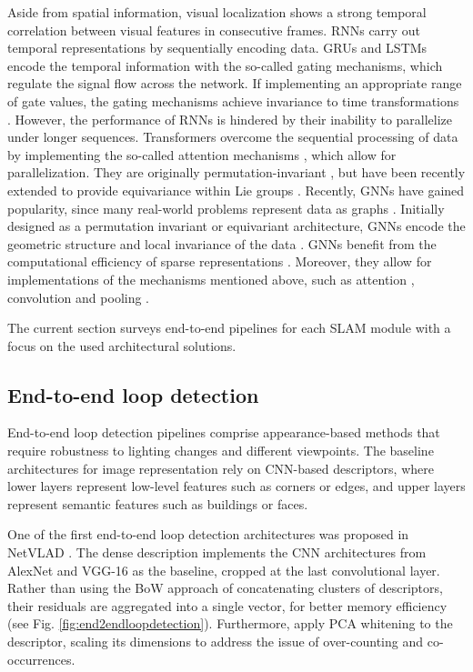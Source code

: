 Aside from spatial information, visual localization shows a strong temporal correlation between visual features in consecutive frames.  
\Acp{RNN} carry out temporal representations by sequentially encoding data. \acfp{GRU} and \acp{LSTM} encode the temporal information with the so-called gating mechanisms, which regulate the signal flow across the network.
If implementing an appropriate range of gate values, the gating mechanisms achieve invariance to time transformations \cite{dl:rnn:canwarptime}. However, the performance of \acp{RNN} is hindered by their inability to parallelize under longer sequences.
Transformers overcome the sequential processing of data by implementing the so-called attention mechanisms \cite{dl:attentioniswhatyouneed}, which allow for parallelization. They are originally permutation-invariant \cite{bronstein2021geometricDL}, but have been recently extended to provide equivariance within Lie groups \cite{dl:lietransformer}. Recently, \acp{GNN} have gained popularity, since many real-world problems represent data as graphs \cite{dl:intro:xia2021graphsurvey}. Initially designed as a permutation invariant or equivariant architecture, \acp{GNN} encode the geometric structure and local invariance of the data \cite{keriven2019gnninvoreq, dl:intro:jiao2022graphvisionsurvey}. \acp{GNN} benefit from the computational efficiency of sparse representations \cite{dl:intro:sparselearning}. Moreover, they allow for implementations of the mechanisms mentioned above, such as attention \cite{velivckovic2017graphattention}, convolution \cite{welling2016convgnn} and pooling \cite{yuan2020structpool}. 

The current section surveys end-to-end pipelines for each SLAM module with a focus on the used architectural solutions.

\subsection{End-to-end loop detection}
\label{sec:deeplearning:loop}


End-to-end loop detection pipelines comprise appearance-based methods that require robustness to lighting changes and different viewpoints. The baseline architectures for image representation rely on \ac{CNN}-based descriptors, where lower layers represent low-level features such as corners or edges, and upper layers represent semantic features such as buildings or faces. 

One of the first end-to-end loop detection architectures was proposed in NetVLAD \cite{arandjelovic2016netvlad}. The dense description implements the \ac{CNN} architectures from AlexNet \cite{krizhevsky2012imagenet-alexnet} and VGG-16 \cite{dl:loopclosure:vgg16} as the baseline, cropped at the last convolutional layer. Rather than using the \ac{BoW} approach of concatenating clusters of descriptors, their residuals are aggregated into a single vector, for better memory efficiency (see Fig. \ref{fig:end2endloopdetection}). Furthermore, \cite{zhu2018attention,arandjelovic2016netvlad} apply PCA whitening to the descriptor, scaling its dimensions to address the issue of over-counting and co-occurrences.

